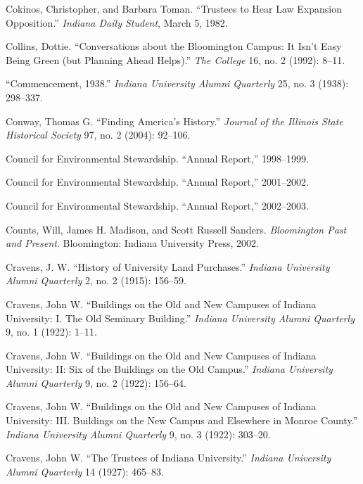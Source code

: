 \documentclass[
  american,
  letterpaper,
]{scrreprt}
\newlength{\cslhangindent}
\newenvironment{CSLReferences}[2] %
 {\begin{list}{}{%
  \setlength{\itemindent}{0pt}
  \setlength{\leftmargin}{0pt}
  \setlength{\parsep}{0pt}
  \ifodd #1
   \setlength{\leftmargin}{\cslhangindent}
   \setlength{\itemindent}{-1\cslhangindent}
  \fi
  \setlength{\itemsep}{#2\baselineskip}}}
 {\end{list}}
\begin{document}
\begin{CSLReferences}{1}{0}
Cokinos, Christopher, and Barbara Toman. {``Trustees to Hear Law
Expansion Opposition.''} \emph{Indiana Daily Student}, March 5, 1982.

Collins, Dottie. {``Conversations about the Bloomington Campus: It Isn't
Easy Being Green (but Planning Ahead Helps).''} \emph{The College} 16,
no. 2 (1992): 8--11.

{``Commencement, 1938.''} \emph{Indiana University Alumni Quarterly} 25,
no. 3 (1938): 298--337.

Conway, Thomas G. {``Finding America's History.''} \emph{Journal of the
Illinois State Historical Society} 97, no. 2 (2004): 92--106.

Council for Environmental Stewardship. {``Annual Report,''} 1998--1999.

Council for Environmental Stewardship. {``Annual Report,''} 2001--2002.

Council for Environmental Stewardship. {``Annual Report,''} 2002--2003.

Counts, Will, James H. Madison, and Scott Russell Sanders.
\emph{Bloomington Past and Present}. Bloomington: Indiana University
Press, 2002.

Cravens, J. W. {``History of University Land Purchases.''} \emph{Indiana
University Alumni Quarterly} 2, no. 2 (1915): 156--59.

Cravens, John W. {``Buildings on the Old and New Campuses of Indiana
University: I. The Old Seminary Building.''} \emph{Indiana University
Alumni Quarterly} 9, no. 1 (1922): 1--11.

Cravens, John W. {``Buildings on the Old and New Campuses of Indiana
University: II: Six of the Buildings on the Old Campus.''} \emph{Indiana
University Alumni Quarterly} 9, no. 2 (1922): 156--64.

Cravens, John W. {``Buildings on the Old and New Campuses of Indiana
University: III. Buildings on the New Campus and Elsewhere in Monroe
County.''} \emph{Indiana University Alumni Quarterly} 9, no. 3 (1922):
303--20.

Cravens, John W. {``The Trustees of Indiana University.''} \emph{Indiana
University Alumni Quarterly} 14 (1927): 465--83.


\end{CSLReferences}
\end{document}

